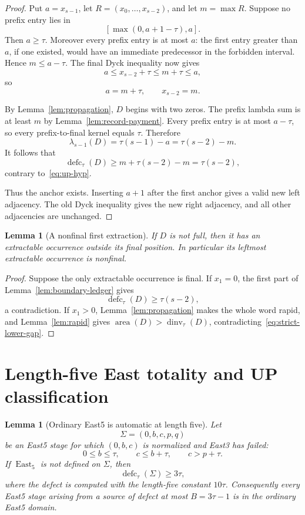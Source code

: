 \documentclass[11pt]{article}
\newtheorem{lemma}[theorem]{Lemma}
\theoremstyle{definition}
\theoremstyle{remark}
\newcommand{\area}{\operatorname{area}}
\newcommand{\dinv}{\operatorname{dinv}}
\newcommand{\defc}{\operatorname{defc}}
\newcommand{\East}{\operatorname{East}}
\begin{document}
\begin{proof}
Put $a=x_{s-1}$, let $R=(x_0,\ldots,x_{s-2})$, and let $m=\max R$.
Suppose no prefix entry lies in
\[
  [\max(0,a+1-\tau),a].
\]
Then $a\ge\tau$.  Moreover every prefix entry is at most $a$: the first
entry greater than $a$, if one existed, would have an immediate predecessor
in the forbidden interval.  Hence $m\le a-\tau$.  The final Dyck inequality
now gives
\[
  a\le x_{s-2}+\tau\le m+\tau\le a,
\]
so
\begin{equation}
  a=m+\tau,
  \qquad x_{s-2}=m.
  \label{eq:max-final-jump}
\end{equation}

By Lemma~\ref{lem:propagation}, $D$ begins with two zeros.  The prefix lambda
sum is at least $m$ by Lemma~\ref{lem:record-payment}.  Every prefix entry is
at most $a-\tau$, so every prefix-to-final kernel equals $\tau$.  Therefore
\[
  \lambda_{s-1}(D)=\tau(s-1)-a=\tau(s-2)-m.
\]
It follows that
\[
  \defc_\tau(D)\ge m+\tau(s-2)-m=\tau(s-2),
\]
contrary to~\eqref{eq:up-hyp}.

Thus the anchor exists.  Inserting $a+1$ after the first anchor gives a valid
new left adjacency.  The old Dyck inequality gives the new right adjacency,
and all other adjacencies are unchanged.
\end{proof}

\begin{lemma}[A nonfinal first extraction]
\label{lem:up-first-position}
If $D$ is not full, then it has an extractable occurrence outside its final
position.  In particular its leftmost extractable occurrence is nonfinal.
\end{lemma}

\begin{proof}
Suppose the only extractable occurrence is final.  If $x_1=0$, the first
part of Lemma~\ref{lem:boundary-ledger} gives
\[
  \defc_\tau(D)\ge\tau(s-2),
\]
a contradiction.  If $x_1>0$, Lemma~\ref{lem:propagation} makes the whole
word rapid, and Lemma~\ref{lem:rapid} gives
$\area(D)>\dinv_\tau(D)$, contradicting~\eqref{eq:strict-lower-gap}.
\end{proof}


\section{Length-five East totality and UP classification}

\begin{lemma}[Ordinary East5 is automatic at length five]
\label{lem:east5-total}
Let
\[
 \Sigma=(0,b,c,p,q)
\]
be an East5 stage for which $(0,b,c)$ is normalized and East3 has failed:
\[
 0\le b\le\tau,
 \qquad c\le b+\tau,
 \qquad c>p+\tau.
\]
If $\East_5$ is not defined on $\Sigma$, then
\[
 \defc_\tau(\Sigma)\ge3\tau,
\]
where the defect is computed with the length-five constant $10\tau$.
Consequently every East5 stage arising from a source of defect at most
$B=3\tau-1$ is in the ordinary East5 domain.
\end{lemma}
\end{document}
